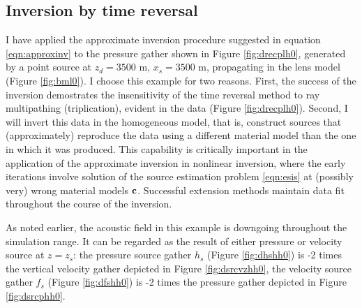 \documentclass[georeport,12pt]{geophysics}
\begin{document}



\subsection{Inversion by time reversal}
I have applied the approximate inversion procedure suggested in
equation \ref{eqn:approxinv} to the pressure gather shown in Figure
\ref{fig:drecplh0}, generated by a point source
at $z_d=3500$ m, $x_s=3500$ m, propagating in the %
lens
model (Figure \ref{fig:bml0}). I choose this example for two
reasons. First, the success of the inversion demostrates the
insensitivity of the time reversal method to ray multipathing
(triplication), evident in the data (Figure \ref{fig:drecplh0}).
Second, I will invert this data in the homogeneous model, that is,
construct sources that (approximately) reproduce the data using a
different material model than the one in which it was produced. This
capability is critically important in the application of the
approximate inversion in nonlinear inversion, where the early iterations
involve solution of the source estimation problem \ref{eqn:esis} at
(possibly very) wrong material models ${\bf c}$. Successful extension
methods maintain data fit throughout the course of the inversion.

As noted earlier, the acoustic field in this example is downgoing
throughout the simulation range. It can be
regarded as the result of either pressure or velocity source at $z=z_s$: the
pressure source gather $h_s$ (Figure \ref{fig:dhshh0})  is -2 times the
vertical velocity gather depicted in Figure \ref{fig:dsrcvzhh0}, the
velocity source gather $f_s$ (Figure \ref{fig:dfshh0}) is -2 times the
pressure gather depicted in Figure \ref{fig:dsrcphh0}.
\end{document}
